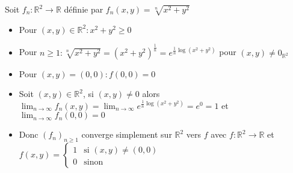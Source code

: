 \documentclass[11pt,hidelinks]{book}
\theoremstyle{mytheoremstyle}
\theoremstyle{mytheoremstyle}
\theoremstyle{mytheoremstyle}
\theoremstyle{mytheoremstyle}
\theoremstyle{mytheoremstyle}
\theoremstyle{mytheoremstyle}
\theoremstyle{mytheoremstyle}
\theoremstyle{mytheoremstyle}
\theoremstyle{myproblemstyle}
\def\mbb#1{\mathbb{#1}}
\def\bR{\mbb{R}}
\def\ln{\lim_{n \to \infty}}
\newcommand{\func}[3]{#1\colon#2\to#3}
\newcommand{\cvs}[2]{converge simplement sur $#1$ vers $#2$}
\newcommand{\deq}[3]{\begin{cases}
    #1 & \text{si } #2 \\
    #3 & \text{sinon}
\end{cases}}
\begin{document}
\begin{adjustwidth}{-2em}{-1em}
\begin{ex}

    Soit $\func{f_n}{\bR^2}{\bR}$ définie par $f_n(x,y) = \sqrt[n]{x^2 + y^2}$ 
    \begin{itemize}[label=$\circ$]
    \item Pour $(x,y) \in \bR^2 \colon x^2 + y^2 \geq 0$  
    \item Pour $n \geq 1\colon \sqrt[n]{x^2 + y^2} = \left(x^2 + y^2\right)^{\frac{1}{n}} = e^{\frac{1}{n}\log(x^2 + y^2)}$ pour $(x,y) \not= 0_{\bR^2}$
    \item Pour $(x,y) = (0,0) \colon f(0,0) = 0$
    
    \item Soit $(x,y) \in \bR^2$, si $(x,y) \not= 0$ alors 
    $\ln f_n(x,y) = \ln e^{\frac{1}{n}\log(x^2 + y^2)} = e^0 = 1$ 
    et $\ln f_n(0,0) = 0$
    
    \item Donc $(f_n)_{n \geq 1}$ \cvs{\bR^2}{f} avec $\func{f}{\bR^2}{\bR}$ et $f(x,y) = \deq{1}{(x,y) \not= (0,0)}{0}$
    \end{itemize}
\end{ex}
\end{adjustwidth}
\end{document}

